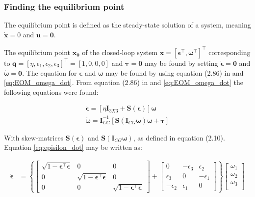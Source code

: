 \subsubsection*{Finding the equilibrium point}

The equilibrium point is defined as the steady-state solution of a system, meaning $\dot{\mathbf{x}} = 0$ and $\mathbf{u}= \mathbf{0}$. 

The equilibrium point $\mathbf{x_0}$ of the closed-loop system $\mathbf{x} = [ \boldsymbol{\epsilon}^\top, \boldsymbol{\omega}^\top]^\top$ corresponding to $\mathbf{q} = [\eta,\epsilon_1, \epsilon_2, \epsilon_3]^\top = [1, 0, 0, 0]$ and $\boldsymbol{\tau} = \boldsymbol{0}$ may be found by setting $\dot{\boldsymbol{\epsilon}} = \mathbf{0}$ and $\dot{\boldsymbol{\omega}} = \mathbf{0}$. The equation for $\boldsymbol{\epsilon}$ and $\boldsymbol{\omega}$ may be found by using equation (2.86) in \cite{Fossen2011} and \eqref{eq:EOM_omega_dot}. From equation (2.86) in \cite{Fossen2011} and \eqref{eq:EOM_omega_dot} the following equations were found:

\begin{subequations}
\label{eq:x_dot}
	\begin{align}
		\dot{\boldsymbol{\epsilon}} =  [ \eta \mathbf{I}_{3X3} + \mathbf{S}(\boldsymbol{\epsilon}) ] \boldsymbol{\omega}  \label{eq:episilon_dot} \\
		 \dot{\boldsymbol{\omega}} = \mathbf{I}_{CG}^{-1} [\mathbf{S} (\mathbf{I}_{CG} \boldsymbol{\omega} ) \boldsymbol{\omega} +  \boldsymbol{\tau} ] \label{eq:omega_dot}
	\end{align}	
\end{subequations}


With skew-matrices $\mathbf{S} (\boldsymbol{\epsilon})$ and $\mathbf{S} (\mathbf{I}_{CG} \boldsymbol{\omega} ) $, as defined in \cite{Fossen2011} equation (2.10). Equation \eqref{eq:episilon_dot} may be written as:


\begin{equation}
    \begin{aligned}
	\dot{\boldsymbol{\epsilon}}
	&= 
	\left \{
	\begin{bmatrix}
		\sqrt{1-\boldsymbol{\epsilon}^\top \boldsymbol{\epsilon}} & 0 &  0  \\
		0 & \sqrt{1-\boldsymbol{\epsilon}^\top \boldsymbol{\epsilon}} &   0   \\
		0 &  0  & \sqrt{1-\boldsymbol{\epsilon}^\top \boldsymbol{\epsilon}} 
	\end{bmatrix}
	+
	\begin{bmatrix}
		0 & -\epsilon_3 &  \epsilon_2   \\
		\epsilon_3 & 0 &   - \epsilon_1   \\
		-\epsilon_2 &  \epsilon_1  & 0
	\end{bmatrix}
	\right \} 
	\begin{bmatrix}
		\omega_1  \\
		\omega_2  \\
		\omega_3  \\
	\end{bmatrix}
	\end{aligned}
	\label{eq:epsilon_dot_full}
\end{equation}

